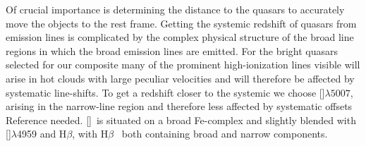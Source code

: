 \documentclass{aa}    %
\newcommand{\hb}{H$\beta$}
\newcommand{\oiii}{[\ion{O}{iii}]}
\begin{document}
Of crucial importance is determining the distance to the quasars to accurately move the objects to the rest frame. Getting the systemic redshift of quasars from emission lines is complicated by the complex physical structure of the broad line regions in which the broad emission lines are emitted. For the bright quasars selected for our composite many of the prominent high-ionization lines visible will arise in hot clouds with large peculiar velocities and will therefore be affected by systematic line-shifts\citep{Richards2002b}. To get a redshift closer to the systemic we choose \oiii$\lambda5007$,  arising in the narrow-line region and therefore less affected by systematic offsets{\color{red} Reference needed}. \oiii~is situated on a broad Fe-complex and slightly blended with \oiii$\lambda$4959 and \hb, with \hb~ both containing broad and narrow components. 
\end{document}
